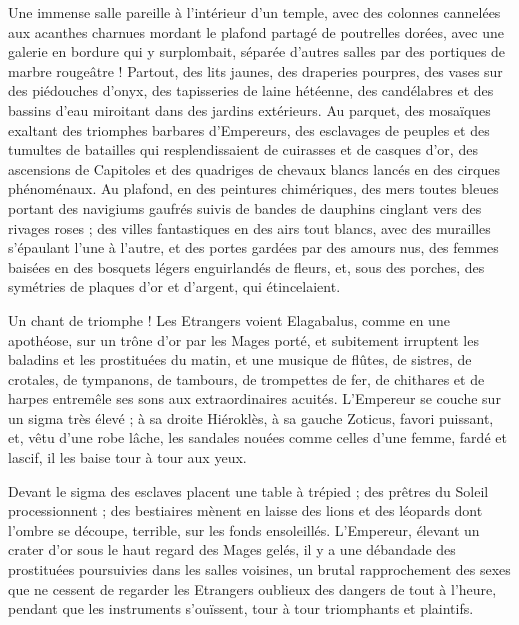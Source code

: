 \documentclass[a4paper, 11pt, oneside, polutonikogreek, french]{article}
\begin{document}
Une immense salle pareille à l'intérieur d'un temple, avec des colonnes cannelées aux acanthes charnues mordant le plafond partagé de poutrelles dorées, avec une galerie en bordure qui y surplombait, séparée d'autres salles par des portiques de marbre rougeâtre ! Partout, des lits jaunes, des draperies pourpres, des vases sur des piédouches d'onyx, des tapisseries de laine hétéenne, des candélabres et des bassins d'eau miroitant dans des jardins extérieurs. Au parquet, des mosaïques exaltant des triomphes barbares d'Empereurs, des esclavages de peuples et des tumultes de batailles qui resplendissaient de cuirasses et de casques d'or, des ascensions de Capitoles et des quadriges de chevaux blancs lancés en des cirques phénoménaux. Au plafond, en des peintures chimériques, des mers toutes bleues portant des navigiums gaufrés suivis de bandes de dauphins cinglant vers des rivages roses ; des villes fantastiques en des airs tout blancs, avec des murailles s'épaulant l'une à l'autre, et des portes gardées par des amours nus, des femmes baisées en des bosquets légers enguirlandés de fleurs, et, sous des porches, des symétries de plaques d'or et d'argent, qui étincelaient.

Un chant de triomphe ! Les Etrangers voient Elagabalus, comme en une apothéose, sur un trône d'or par les Mages porté, et subitement irruptent les baladins et les prostituées du matin, et une musique de flûtes, de sistres, de crotales, de tympanons, de tambours, de trompettes de fer, de chithares et de harpes entremêle ses sons aux extraordinaires acuités. L'Empereur se couche sur un sigma très élevé ; à sa droite Hiéroklès, à sa gauche Zoticus, favori puissant, et, vêtu d'une robe lâche, les sandales nouées comme celles d’une femme, fardé et lascif, il les baise tour à tour aux yeux.

Devant le sigma des esclaves placent une table à trépied ; des prêtres du Soleil processionnent ; des bestiaires mènent en laisse des lions et des léopards dont l'ombre se découpe, terrible, sur les fonds ensoleillés. L'Empereur, élevant un crater d'or sous le haut regard des Mages gelés, il y a une débandade des prostituées poursuivies dans les salles voisines, un brutal rapprochement des sexes que ne cessent de regarder les Etrangers oublieux des dangers de tout à l'heure, pendant que les instruments s'ouïssent, tour à tour triomphants et plaintifs.
\end{document}
